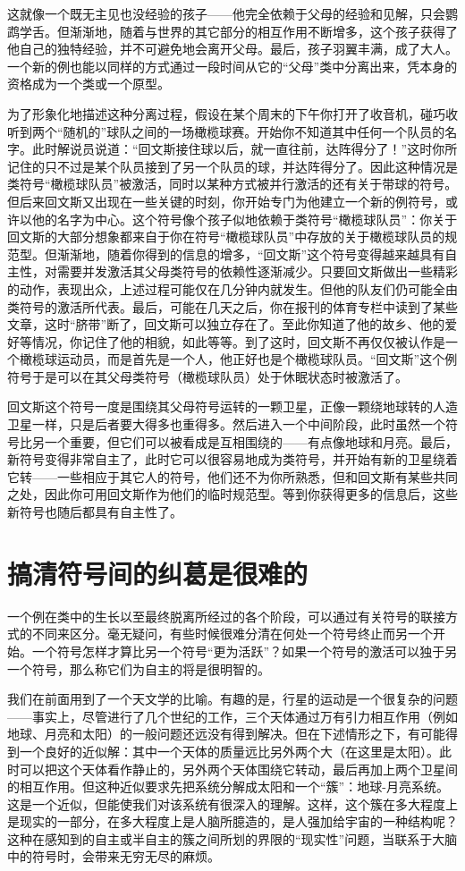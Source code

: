 这就像一个既无主见也没经验的孩子——他完全依赖于父母的经验和见解，只会鹦鹉学舌。但渐渐地，随着与世界的其它部分的相互作用不断增多，这个孩子获得了他自己的独特经验，并不可避免地会离开父母。最后，孩子羽翼丰满，成了大人。一个新的例也能以同样的方式通过一段时间从它的“父母”类中分离出来，凭本身的资格成为一个类或一个原型。

为了形象化地描述这种分离过程，假设在某个周末的下午你打开了收音机，碰巧收听到两个“随机的”球队之间的一场橄榄球赛。开始你不知道其中任何一个队员的名字。此时解说员说道：“回文斯接住球以后，就一直往前，达阵得分了！”这时你所记住的只不过是某个队员接到了另一个队员的球，并达阵得分了。因此这种情况是类符号“橄榄球队员”被激活，同时以某种方式被并行激活的还有关于带球的符号。但后来回文斯又出现在一些关键的时刻，你开始专门为他建立一个新的例符号，或许以他的名字为中心。这个符号像个孩子似地依赖于类符号“橄榄球队员”：你关于回文斯的大部分想象都来自于你在符号“橄榄球队员”中存放的关于橄榄球队员的规范型。但渐渐地，随着你得到的信息的增多，“回文斯”这个符号变得越来越具有自主性，对需要并发激活其父母类符号的依赖性逐渐减少。只要回文斯做出一些精彩的动作，表现出众，上述过程可能仅在几分钟内就发生。但他的队友们仍可能全由类符号的激活所代表。最后，可能在几天之后，你在报刊的体育专栏中读到了某些文章，这时“脐带”断了，回文斯可以独立存在了。至此你知道了他的故乡、他的爱好等情况，你记住了他的相貌，如此等等。到了这时，回文斯不再仅仅被认作是一个橄榄球运动员，而是首先是一个人，他正好也是个橄榄球队员。“回文斯”这个例符号于是可以在其父母类符号（橄榄球队员）处于休眠状态时被激活了。

回文斯这个符号一度是围绕其父母符号运转的一颗卫星，正像一颗绕地球转的人造卫星一样，只是后者要大得多也重得多。然后进入一个中间阶段，此时虽然一个符号比另一个重要，但它们可以被看成是互相围绕的——有点像地球和月亮。最后，新符号变得非常自主了，此时它可以很容易地成为类符号，并开始有新的卫星绕着它转——一些相应于其它人的符号，他们还不为你所熟悉，但和回文斯有某些共同之处，因此你可用回文斯作为他们的临时规范型。等到你获得更多的信息后，这些新符号也随后都具有自主性了。

\section{搞清符号间的纠葛是很难的}

一个例在类中的生长以至最终脱离所经过的各个阶段，可以通过有关符号的联接方式的不同来区分。毫无疑问，有些时候很难分清在何处一个符号终止而另一个开始。一个符号怎样才算比另一个符号“更为活跃”？如果一个符号的激活可以独于另一个符号，那么称它们为自主的将是很明智的。

我们在前面用到了一个天文学的比喻。有趣的是，行星的运动是一个很复杂的问题——事实上，尽管进行了几个世纪的工作，三个天体通过万有引力相互作用（例如地球、月亮和太阳）的一般问题还远没有得到解决。但在下述情形之下，有可能得到一个良好的近似解：其中一个天体的质量远比另外两个大（在这里是太阳）。此时可以把这个天体看作静止的，另外两个天体围绕它转动，最后再加上两个卫星间的相互作用。但这种近似要求先把系统分解成太阳和一个“簇”：地球-月亮系统。这是一个近似，但能使我们对该系统有很深入的理解。这样，这个簇在多大程度上是现实的一部分，在多大程度上是人脑所臆造的，是人强加给宇宙的一种结构呢？这种在感知到的自主或半自主的簇之间所划的界限的“现实性”问题，当联系于大脑中的符号时，会带来无穷无尽的麻烦。

